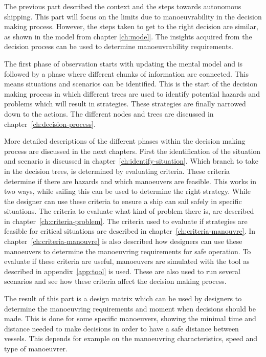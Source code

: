 The previous part described the context and the steps towards autonomous shipping. This part will focus on the limits due to manoeuvrability in the decision making process. However, the steps taken to get to the right decision are similar, as shown in the model from chapter \ref{ch:model}. The insights acquired from the decision process can be used to determine manoeuvrability requirements.

The first phase of observation starts with updating the mental model and is followed by a phase where different chunks of information are connected. This means situations and scenarios can be identified. This is the start of the decision making process in which different trees are used to identify potential hazards and problems which will result in strategies. These strategies are finally narrowed down to the actions. The different nodes and trees are discussed in chapter~\ref{ch:decision-process}. 

More detailed descriptions of the different phases within the decision making process are discussed in the next chapters. First the identification of the situation and scenario is discussed in chapter~\ref{ch:identify-situation}.
Which branch to take in the decision trees, is determined by evaluating criteria. These criteria determine if there are hazards and which manoeuvers are feasible. This works in two ways, while sailing this can be used to determine the right strategy. While the designer can use these criteria to ensure a ship can sail safely in specific situations. The criteria to evaluate what kind of problem there is, are described in chapter~\ref{ch:criteria-problem}. The criteria used to evaluate if strategies are feasible for critical situations are described in chapter~\ref{ch:criteria-manouvre}. In chapter~\ref{ch:criteria-manouvre} is also described how designers can use these manoeuvers to determine the manoeuvring requirements for safe operation. To evaluate if these criteria are useful, manoeuvers are simulated with the tool as described in appendix~\ref{app:tool} is used. These are also used to run several scenarios and see how these criteria affect the decision making process.

The result of this part is a design matrix which can be used by designers to determine the manoeuvring requirements and moment when decisions should be made. This is done for some specific manoeuvers, showing the minimal time and distance needed to make decisions in order to have a safe distance between vessels. This depends for example on the manoeuvring characteristics, speed and type of manoeuvrer.